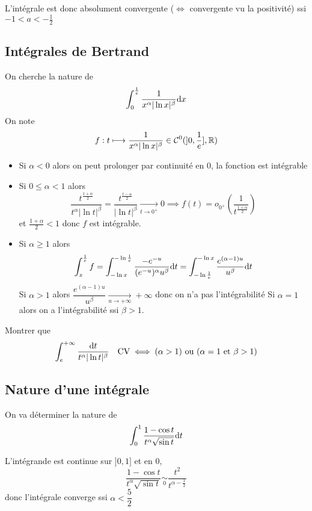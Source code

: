 L'intégrale est donc absolument convergente ($\iff$ convergente vu la positivité) ssi $-1<a<-\frac12$

\subsection{Intégrales de Bertrand}


On cherche la nature de \[
    \int_0^{\frac1e}\frac1{x^\alpha|\ln x|^\beta}\mathrm{d} x
\]
On note \[
    f:t\longmapsto \frac1{x^\alpha|\ln x|^\beta}\in\mathcal C^0(]0, \frac1e], \mathbb R)
\]
\begin{itemize}
    \item Si $\alpha<0$ alors on peut prolonger par continuité en $0$, la fonction est intégrable
    \item Si $0\leq \alpha<1$ alors \[
            \frac{t^{\frac{1+\alpha}2}}{t^\alpha|\ln t|^\beta}=\frac{t^{\frac{t-\alpha}2}}{|\ln t|^\beta}\xrightarrow[t\to 0^+]{}0\implies f(t)=o_{0^+} \left( \frac1{t^{\frac{1+\alpha}2}} \right)
        \]
        et $\frac{1+\alpha}2<1$ donc $f$ est intégrable.
    \item Si $\alpha \geq 1$ alors \[
            \int_x^{\frac1e}f=\int_{-\ln x}^{-\ln\frac1e}\frac{-e^{-u}}{(e^{-u})^\alpha u^\beta}\mathrm{d} t=\int_{-\ln \frac1e}^{-\ln x}\frac{e^{(\alpha-1)u}}{u^\beta}\mathrm{d} t
        \]
        Si $\alpha>1$ alors $\dfrac{e^{(\alpha-1)u}}{u^\beta}\xrightarrow[u\to+\infty]{}+\infty$ donc on n'a pas l'intégrabilité
        Si $\alpha=1$ alors on a l'intégrabilité ssi $\beta >1$.
\end{itemize}

\begin{exo}
    Montrer que \[
        \int_e^{+\infty}\frac{\mathrm{d} t}{t^\alpha|\ln t|^\beta}\quad \text{CV}\iff (\alpha>1)\text{ ou }(\alpha=1\text{ et }\beta>1)
    \]
\end{exo}

\subsection{Nature d'une intégrale}

On va déterminer la nature de \[
    \int_0^1\frac{1-\cos t}{t^\alpha\sqrt{\sin t}}\mathrm{d} t
\]

L'intégrande est continue sur $]0, 1]$ et en $0$, \[
    \frac{1-\cos t}{t^\alpha\sqrt{\sin t}}\underset 0\sim\frac{t^2}{t^{\alpha-\frac12}}
\]
donc l'intégrale converge ssi $\alpha<\dfrac 52$

